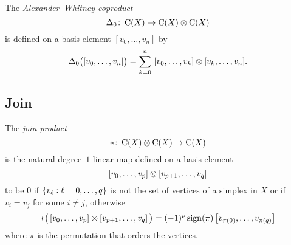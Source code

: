 The \textit{Alexander--Whitney coproduct}
\[
\Delta_0 \colon \operatorname{C}(X) \to \operatorname{C}(X) \otimes \operatorname{C}(X)
\]
is defined on a basis element $[v_0, \dots, v_n]$ by
\begin{equation*} \label{e:alexander-whitney coalgebra}
	\Delta_0 \big( [v_0, \dots, v_n] \big) =
	\sum_{k=0}^n \ [v_0, \dots, v_k] \otimes [v_k, \dots, v_n].
\end{equation*}

\subsection{Join}

The \textit{join product}
\[
\ast \colon \operatorname{C}(X) \otimes \operatorname{C}(X) \to \operatorname{C}(X)
\]
is the natural degree~$1$ linear map defined on a basis element
\[
[v_0, \dots, v_p] \otimes [v_{p+1}, \dots, v_q]
\]
to be $0$ if $\{v_\ell : \ell = 0, \dots, q\}$ is not the set of vertices of a simplex in $X$ or if $v_i = v_j$ for some $i \neq j$,
otherwise
\[
\ast \big(\left[v_0, \dots, v_p \right] \otimes \left[v_{p+1}, \dots, v_q\right]\big) =
(-1)^{p} \operatorname{sign}(\pi) \left[v_{\pi(0)}, \dots, v_{\pi(q)}\right]
\]
where $\pi$ is the permutation that orders the vertices.

